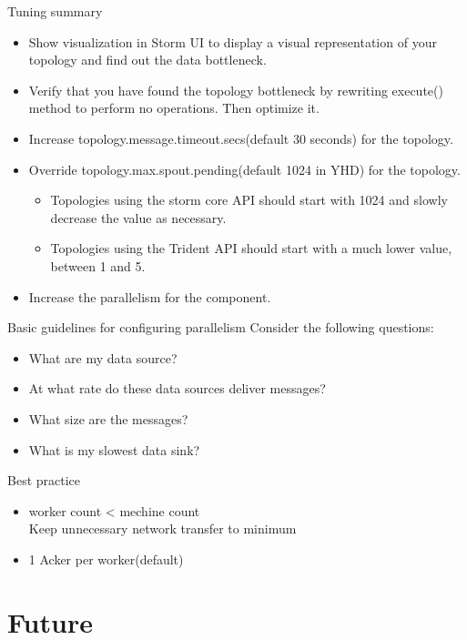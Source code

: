 \documentclass{beamer}
\begin{document}
\begin{frame}{Tuning summary}
  \begin{itemize}
    \item Show visualization in Storm UI to display a visual representation of your topology and find out the data bottleneck.
    \item Verify that you have found the topology bottleneck by rewriting execute() method to perform no operations. Then optimize it.
    \item Increase topology.message.timeout.secs(default 30 seconds) for the topology.
    \item Override topology.max.spout.pending(default 1024 in YHD) for the topology.
      \begin{itemize}
	\item Topologies using the storm core API should start with 1024 and slowly decrease the value as necessary.
	\item Topologies using the Trident API should start with a much lower value, between 1 and 5.
      \end{itemize}
    \item Increase the parallelism for the component.
  \end{itemize}
\end{frame}
\begin{frame}{Basic guidelines for configuring parallelism}
  Consider the following questions:
  \begin{itemize}
    \item What are my data source?
    \item At what rate do these data sources deliver messages?
    \item What size are the messages?
    \item What is my slowest data sink?
  \end{itemize}
\end{frame}
\begin{frame}{Best practice}
  \begin{itemize}
    \item worker count < mechine count\\
      Keep unnecessary network transfer to minimum
    \item 1 Acker per worker(default)
  \end{itemize}
\end{frame}

\section{Future}
\end{document}
